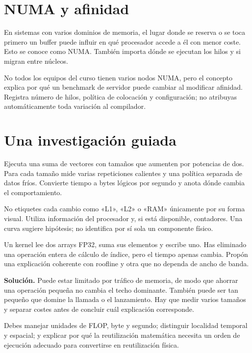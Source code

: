 \documentclass[12pt,a4paper,oneside]{report}
\begin{document}
\section{NUMA y afinidad}
En sistemas con varios dominios de memoria, el lugar donde se reserva o se toca primero un buffer puede influir en qué procesador accede a él con menor coste. Esto se conoce como NUMA. También importa dónde se ejecutan los hilos y si migran entre núcleos.

No todos los equipos del curso tienen varios nodos NUMA, pero el concepto explica por qué un benchmark de servidor puede cambiar al modificar afinidad. Registra número de hilos, política de colocación y configuración; no atribuyas automáticamente toda variación al compilador.

\section{Una investigación guiada}
Ejecuta una suma de vectores con tamaños que aumenten por potencias de dos. Para cada tamaño mide varias repeticiones calientes y una política separada de datos fríos. Convierte tiempo a bytes lógicos por segundo y anota dónde cambia el comportamiento.

No etiquetes cada cambio como «L1», «L2» o «RAM» únicamente por su forma visual. Utiliza información del procesador y, si está disponible, contadores. Una curva sugiere hipótesis; no identifica por sí sola un componente físico.

\begin{practica}
Un kernel lee dos arrays FP32, suma sus elementos y escribe uno. Has eliminado una operación entera de cálculo de índice, pero el tiempo apenas cambia. Propón una explicación coherente con roofline y otra que no dependa de ancho de banda.

\end{practica}
\textbf{Solución.} Puede estar limitado por tráfico de memoria, de modo que ahorrar una operación pequeña no cambia el techo dominante. También puede ser tan pequeño que domine la llamada o el lanzamiento. Hay que medir varios tamaños y separar costes antes de concluir cuál explicación corresponde.

\begin{comprueba}
Debes manejar unidades de FLOP, byte y segundo; distinguir localidad temporal y espacial; y explicar por qué la reutilización matemática necesita un orden de ejecución adecuado para convertirse en reutilización física.

\end{comprueba}
\end{document}
